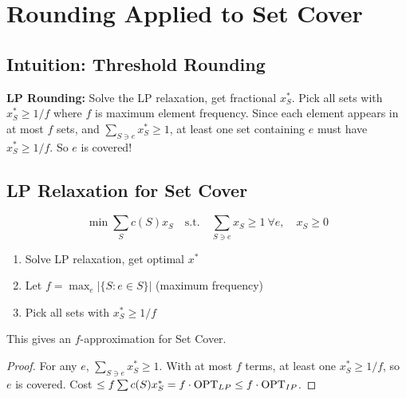 \setcounter{chapter}{13}
\chapter{Rounding Applied to Set Cover}
\label{ch:setcover_rounding}

\section{Intuition: Threshold Rounding}

\begin{intuitionbox}
\textbf{LP Rounding:} Solve the LP relaxation, get fractional $x^*_S$. Pick all sets with $x^*_S \geq 1/f$ where $f$ is maximum element frequency. Since each element appears in at most $f$ sets, and $\sum_{S \ni e} x^*_S \geq 1$, at least one set containing $e$ must have $x^*_S \geq 1/f$. So $e$ is covered!
\end{intuitionbox}

\section{LP Relaxation for Set Cover}

\[
\min \sum_S c(S) x_S \quad \text{s.t.} \quad \sum_{S \ni e} x_S \geq 1 \ \forall e, \quad x_S \geq 0
\]

\begin{algorithmdef}
\begin{enumerate}
    \item Solve LP relaxation, get optimal $x^*$
    \item Let $f = \max_e |\{S : e \in S\}|$ (maximum frequency)
    \item Pick all sets with $x^*_S \geq 1/f$
\end{enumerate}
\end{algorithmdef}

\begin{theorem}
This gives an $f$-approximation for Set Cover.
\end{theorem}
\begin{proof}
For any $e$, $\sum_{S \ni e} x^*_S \geq 1$. With at most $f$ terms, at least one $x^*_S \geq 1/f$, so $e$ is covered. Cost $\leq f \sum c(S) x^*_S = f \cdot \mathrm{OPT}_{LP} \leq f \cdot \mathrm{OPT}_{IP}$.
\end{proof}


